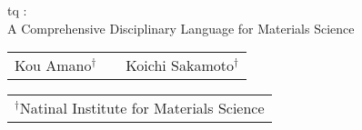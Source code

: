 \documentclass[portrait,a0,oldgerm]{a0poster}
\def\areaspace{9.4mm}
\begin{document}
\begin{center}
\vspace{25mm}
\end{center}


\begin{center}
\color[cmyk]{0,1,1,0.9}
\linespread{5.0}\fontsize{90}{20}\selectfont
tq :\\A Comprehensive Disciplinary Language for Materials Science
\end{center}
\vspace{20mm}
\color[cmyk]{0,1,1,0.85}
\linespread{1.4}\fontsize{50}{20}\selectfont
\begin{center} \begin{tabular}[t]{ccc}
Kou Amano$^{\dag}$ &&Koichi Sakamoto$^{\dag}$ \\
\end{tabular} \end{center}
\color[cmyk]{0,1,1,0.82}
\linespread{1.4}\fontsize{48}{20}\selectfont
\begin{center} \begin{tabular}{c} 
$^\dag$Natinal Institute for Materials Science \\
\end{tabular} \end{center}

\vspace{25mm}
\vspace{25mm}

\color[cmyk]{1,1,0,0.8}
\begin{multicols}{3}
\noindent 

\vspace{\areaspace} \noindent 

\vspace{\areaspace} \noindent 

\noindent 

\noindent 

\vspace{\areaspace} \noindent 

\vspace{\areaspace} \noindent 

\end{multicols}
\end{document}
